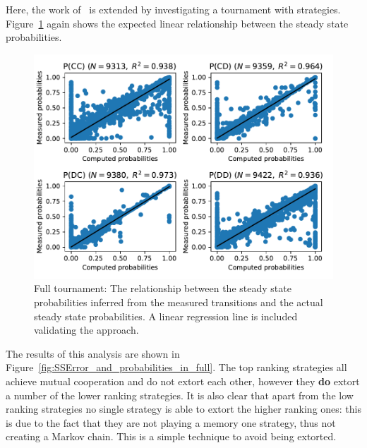 \documentclass[a4paper]{article}
\begin{document}
Here, the work of~\cite{Stewart2012} is extended by investigating a tournament
with 
strategies.
Figure~\ref{fig:computed_probabilities_vs_theoretic_probabilities_in_full} again
shows the expected linear relationship between the steady state probabilities.

\begin{figure}[!htbp]
    \centering
    \includegraphics[width=.8\textwidth]{./assets/img/computed_probabilities_vs_theoretic_probabilities_in_full/main.pdf}
    \caption{Full tournament: The
        relationship between the steady state probabilities inferred from the
        measured transitions and the actual steady state probabilities. A linear
        regression line is included validating the approach.}
    \label{fig:computed_probabilities_vs_theoretic_probabilities_in_full}
\end{figure}

The results of this analysis are shown in
Figure~\ref{fig:SSError_and_probabilities_in_full}. The top ranking strategies
all achieve mutual cooperation and do not extort each other, however they
\textbf{do} extort a number of the lower ranking strategies.
It is also clear that apart from the low ranking strategies no single
strategy is able to extort the higher ranking ones: this is due to the fact that
they are not playing a memory one strategy, thus not creating a Markov chain.
This is a simple technique to avoid being extorted.
\end{document}
